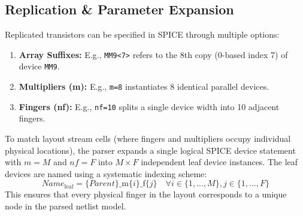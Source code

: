 \subsection{Replication \& Parameter Expansion}
Replicated transistors can be specified in SPICE through multiple options:
\begin{enumerate}
    \item \textbf{Array Suffixes:} E.g., \texttt{MM9<7>} refers to the 8th copy (0-based index 7) of device \texttt{MM9}.
    \item \textbf{Multipliers (m):} E.g., \texttt{m=8} instantiates 8 identical parallel devices.
    \item \textbf{Fingers (nf):} E.g., \texttt{nf=10} splits a single device width into 10 adjacent fingers.
\end{enumerate}

To match layout stream cells (where fingers and multipliers occupy individual physical locations), the parser expands a single logical SPICE device statement with $m=M$ and $nf=F$ into $M \times F$ independent leaf device instances. The leaf devices are named using a systematic indexing scheme:
\begin{equation}
    Name_{\text{leaf}} = \{Parent\}\text{\_m}\{i\}\text{\_f}\{j\} \quad \forall i \in \{1,\dots,M\}, j \in \{1,\dots,F\}
\end{equation}
This ensures that every physical finger in the layout corresponds to a unique node in the parsed netlist model.

